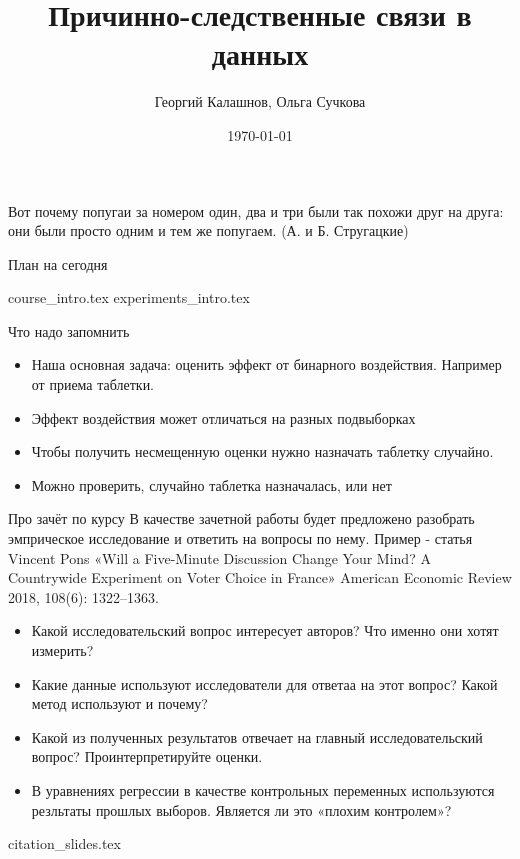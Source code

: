 \documentclass[handout,12pt]{beamer}
\title{Причинно-следственные связи в данных}
\author[Георгий Калашнов, Ольга Сучкова]{Георгий Калашнов, Ольга Сучкова}
\date{\today}
\begin{document}
\begin{frame}
  \titlepage
  \begin{flushright}
     Вот почему попугаи за номером один, два и три были так похожи друг на друга: они были просто одним и тем же попугаем. (А. и Б. Стругацкие)
  \end{flushright}
\end{frame}


\begin{frame}{План на сегодня} 
\tableofcontents
\end{frame}

{course_intro.tex}
{experiments_intro.tex}


\begin{frame}{Что надо запомнить}
    \begin{itemize}
        \item Наша основная задача: оценить эффект от бинарного воздействия. Например от приема таблетки.
        \item Эффект воздействия может отличаться на разных подвыборках
        \item Чтобы получить несмещенную оценки нужно назначать таблетку случайно.
        \item Можно проверить, случайно таблетка назначалась, или нет
    \end{itemize}
\end{frame}

\begin{frame}{Про зачёт по курсу}
В качестве зачетной работы будет предложено разобрать эмприческое исследование и ответить на вопросы по нему. 
Пример - статья Vincent Pons «Will a Five-Minute Discussion Change Your Mind? A Countrywide Experiment on Voter Choice in France» American Economic
Review 2018, 108(6): 1322–1363.
\begin{itemize}
      \item Какой исследовательский вопрос интересует авторов? Что именно они хотят измерить?
    \item Какие данные используют исследователи для ответаа на этот вопрос? Какой метод используют и почему?
    \item Какой из полученных результатов отвечает на главный исследовательский вопрос? Проинтерпретируйте оценки.
    \item В уравнениях регрессии в качестве контрольных переменных используются резльтаты прошлых выборов. Является ли это «плохим контролем»?
\end{itemize} 
\end{frame}

{citation_slides.tex}
\end{document}
